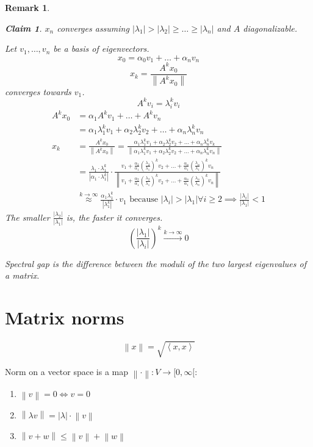 \documentclass[a4paper]{article}
\newcounter{lecref}[section]
\numberwithin{lecref}{section}
\newtheorem*{claim}{Claim}
\newtheorem{remark}[lecref]{Remark}
\newcommand{\angel}[1]{\left\langle#1\right\rangle}
\newcommand{\norm}[1]{\left\|#1\right\|}
\newcommand{\card}[1]{\left|#1\right|}
\begin{document}
\begin{remark}
\begin{description}
    \begin{claim}
      $x_n$ converges assuming $\card{\lambda_1} > \card{\lambda_2} \geq \dots \geq \card{\lambda_n}$ and $A$ diagonalizable.
    \end{claim}
    Let $v_1, \dots, v_n$ be a basis of eigenvectors.
    \[ x_0 = \alpha_0 v_1 + \dots + \alpha_n v_n \]
    \[ x_k = \frac{A^k x_0}{\norm{A^k x_0}} \]
    converges towards $v_1$.
    \[ A^k v_i = \lambda_i^k v_i \]
    \begin{align*}
      A^k x_0 &= \alpha_1 A^k v_1 + \dots + A^k v_n \\
          &= \alpha_1 \lambda_1^k v_1 + \alpha_2 \lambda_2^k v_2 + \dots + \alpha_n \lambda_n^k v_n \\
      x_k &= \frac{A^k x_0}{\norm{A^k x_0}} = \frac{\alpha_1 \lambda_1^k v_1 + \alpha_2 \lambda_2^k v_2 + \dots + \alpha_n \lambda_n^k v_k}{\norm{\alpha_1 \lambda_1^k v_1 + \alpha_2 \lambda_2^k v_2 + \dots + \alpha_n \lambda_n^k v_n}} \\
          &= \frac{\lambda_1 \cdot \lambda_1^k}{\card{\alpha_1 \cdot \lambda_1^k}} \cdot
            \frac{v_1 + \frac{\alpha_2}{\alpha_1} \left(\frac{\lambda_2}{\lambda_1}\right)^k v_2 + \dots + \frac{\alpha_n}{\alpha_1} \left(\frac{\lambda_n}{\lambda_1}\right)^k v_n}{\norm{v_1 + \frac{\alpha_2}{\alpha_1} \left(\frac{\lambda_2}{\lambda_1}\right)^k v_2 + \dots + \frac{\alpha_n}{\alpha_1} \left(\frac{\lambda_n}{\lambda_n}\right)^k v_n}} \\
          &\overset{k \to \infty}\approx \frac{\alpha_1 \lambda_1^k}{\card{\lambda_1^k}} \cdot v_1 \text{ because }
          \card{\lambda_i} > \card{\lambda_1} \forall i \geq 2 \implies \frac{\card{\lambda_i}}{\card{\lambda_1}} < 1
    \end{align*}
    The smaller $\frac{\card{\lambda_2}}{\card{\lambda_1}}$ is, the faster it converges.
    \[ \left(\frac{\card{\lambda_1}}{\card{\lambda_i}}\right)^k \xrightarrow{k \to \infty} 0 \]
  \end{description}

  \emph{Spectral gap} is the difference between the moduli of the two largest eigenvalues of a matrix.
\end{remark}

\section{Matrix norms}
\[ \norm{x} = \sqrt{\angel{x, x}} \]

Norm on a vector space is a map $\norm{\cdot}: V \to [0, \infty[$:
\begin{enumerate}
  \item $\norm{v} = 0 \iff v = 0$
  \item $\norm{\lambda v} = \card{\lambda} \cdot \norm{v}$
  \item $\norm{v + w} \leq \norm{v} + \norm{w}$
\end{enumerate}
\end{document}
